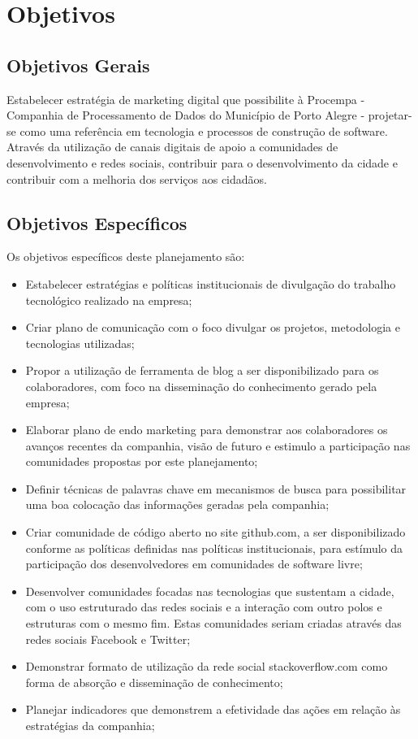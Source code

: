 \chapter{Objetivos}
\section{Objetivos Gerais}
Estabelecer estratégia de marketing digital que possibilite à Procempa - Companhia de Processamento de Dados do Município de Porto Alegre - projetar-se como uma referência em tecnologia e processos de construção de software. Através da utilização de canais digitais de apoio a comunidades de desenvolvimento e redes sociais, contribuir para o desenvolvimento da cidade e contribuir com a melhoria dos serviços aos cidadãos.

\section{Objetivos Específicos}
Os objetivos específicos deste planejamento são:
\begin{itemize}
\item Estabelecer estratégias e políticas institucionais de divulgação do trabalho tecnológico realizado na empresa;
\item Criar plano de comunicação com o foco divulgar os projetos, metodologia e tecnologias utilizadas;
\item Propor a utilização de ferramenta de blog a ser disponibilizado para os colaboradores, com foco na disseminação do conhecimento gerado pela empresa;
\item Elaborar plano de endo marketing para demonstrar aos colaboradores os avanços recentes da companhia, visão de futuro e estimulo a participação nas comunidades propostas por este planejamento;
\item Definir técnicas de palavras chave em mecanismos de busca para possibilitar uma boa colocação das informações geradas pela companhia;
\item Criar comunidade de código aberto no site github.com, a ser disponibilizado conforme as políticas definidas nas políticas institucionais, para estímulo da participação dos desenvolvedores em comunidades de software livre;
\item Desenvolver comunidades focadas nas tecnologias que sustentam a cidade, com o uso estruturado das redes sociais e a interação com outro polos e estruturas com o mesmo fim. Estas comunidades seriam criadas através das redes sociais Facebook e Twitter;
\item Demonstrar formato de utilização da rede social stackoverflow.com como forma de absorção e disseminação de conhecimento;
\item Planejar indicadores que demonstrem a efetividade das ações em relação às estratégias da companhia;
\end{itemize}
